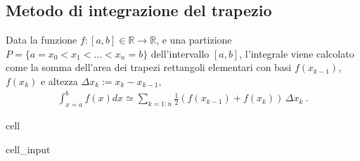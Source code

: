\documentclass[letterpaper,10pt,italian]{jupyterBook}
\begin{document}
\subsection{Metodo di integrazione del trapezio}
\label{\detokenize{ch/numerics/integrals:metodo-di-integrazione-del-trapezio}}
\sphinxAtStartPar
Data la funzione \(f:[a,b] \in \mathbb{R} \rightarrow \mathbb{R}\), e una partizione \(P = \{ a = x_0 < x_1 < \dots < x_n = b \}\) dell’intervallo \([a,b]\), l’integrale viene calcolato come la somma dell’area dei trapezi rettangoli elementari con basi \(f(x_{k-1})\), \(f(x_k)\) e altezza \(\Delta x_k := x_k - x_{k-1}\),
\begin{equation*}
\begin{split}\int_{x=a}^{b} f(x) dx \simeq \sum_{k=1:n} \frac{1}{2} \left( f(x_{k-1}) + f(x_k) \right) \, \Delta x_k \ . \end{split}
\end{equation*}
\begin{sphinxuseclass}{cell}\begin{sphinxVerbatimInput}

\begin{sphinxuseclass}{cell_input}
\begin{sphinxVerbatim}[commandchars=\\\{\}]

    
                  \PYG{p}{[}\PYG{p}{]}  
      \PYG{p}{[}\PYG{p}{]}  \PYG{p}{[}\PYG{p}{]}

           \PYG{p}{[}\PYG{p}{]}  \PYG{p}{[}\PYG{p}{]}  
    
\end{sphinxVerbatim}

\end{sphinxuseclass}\end{sphinxVerbatimInput}

\end{sphinxuseclass}
\end{document}
